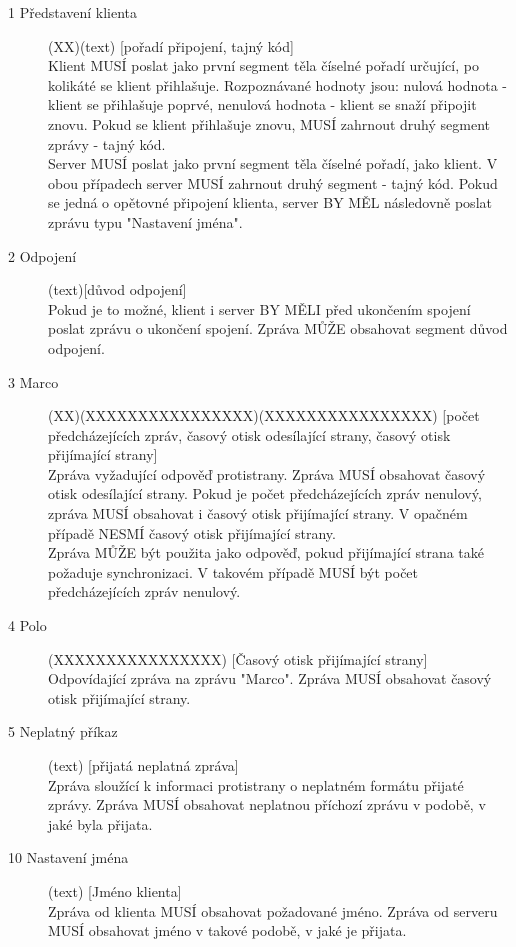 \documentclass[12pt,a4paper]{article}
\begin{document}
\begin{description}
\item[1 Představení klienta] (XX)(text) [pořadí připojení, tajný kód] \\
Klient MUSÍ poslat jako první segment těla číselné pořadí určující, po kolikáté se klient přihlašuje. Rozpoznávané hodnoty jsou: nulová hodnota - klient se přihlašuje poprvé, nenulová hodnota - klient se snaží připojit znovu. Pokud se klient přihlašuje znovu, MUSÍ zahrnout druhý segment zprávy - tajný kód. \\
Server MUSÍ poslat jako první segment těla číselné pořadí, jako klient. V obou případech server MUSÍ zahrnout druhý segment - tajný kód.
Pokud se jedná o opětovné připojení klienta, server BY MĚL následovně poslat zprávu typu "Nastavení jména".
\item[2 Odpojení] (text)[důvod odpojení]\\
Pokud je to možné, klient i server BY MĚLI před ukončením spojení poslat zprávu o ukončení spojení. Zpráva MŮŽE obsahovat segment důvod odpojení.
\item[3 Marco] (XX)(XXXXXXXXXXXXXXXX)(XXXXXXXXXXXXXXXX) [počet předcházejících zpráv, časový otisk odesílající strany, časový otisk přijímající strany] \\
Zpráva vyžadující odpověď protistrany. Zpráva MUSÍ obsahovat časový otisk odesílající strany. Pokud je počet předcházejících zpráv nenulový, zpráva MUSÍ obsahovat i časový otisk přijímající strany. V opačném případě NESMÍ časový otisk přijímající strany. \\
Zpráva MŮŽE být použita jako odpověď, pokud přijímající strana také požaduje synchronizaci. V takovém případě MUSÍ být počet předcházejících zpráv nenulový.
\item[4 Polo] (XXXXXXXXXXXXXXXX) [Časový otisk přijímající strany]\\
Odpovídající zpráva na zprávu "Marco". Zpráva MUSÍ obsahovat časový otisk přijímající strany.
\item[5 Neplatný příkaz] (text) [přijatá neplatná zpráva]\\
Zpráva sloužící k informaci protistrany o neplatném formátu přijaté zprávy. Zpráva MUSÍ obsahovat neplatnou příchozí zprávu v podobě, v jaké byla přijata.
\item[10 Nastavení jména] (text) [Jméno klienta] \\
Zpráva od klienta MUSÍ obsahovat požadované jméno. Zpráva od serveru MUSÍ obsahovat jméno v takové podobě, v jaké je přijata.
\end{description}
\end{document}
